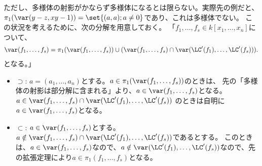 ただし、多様体の射影がかならず多様体になるとは限らない。実際先の例だと、
$\pi_1(\var(y-z,xy-1))= \set{(a,a); a\neq 0}$であり、これは多様体でない。
この状況を考えるために、次の分解を用意しておく。
「$f_1,\dots,f_s \in k[x_1,\dots,x_n]$について、
\begin{align}
  \var(f_1,\dots,f_s)
  =
  \pi_1(\var(f_1,\dots,f_s))
  \cup
  (\var(f_1,\dots,f_s) \cap \var(\LC'(f_1),\dots,\LC'(f_s))).
\end{align}
となる。」
\begin{myproof}
  \begin{itemize}
    \item $\supset$:
    $a=(a_1,\dots,a_n)$とする。$a\in \pi_1(\var(f_1,\dots,f_s))$のときは、
    先の「多様体の射影は部分解に含まれる」より、$a\in \var(f_1,\dots,f_s)$となる。
    $a\in \var(f_1,\dots,f_s)\cap \var(\LC'(f_1),\dots,\LC'(f_s))$
    のときは自明に$a\in \var(f_1,\dots,f_s)$となる。
    \item $\subset$:
    $a\in \var(f_1,\dots,f_s)$とする。
    $a\notin \var(f_1,\dots,f_s)\cap \var(\LC'(f_1),\dots,\LC'(f_s))$であるとする。
    このときは、$a\in \var(f_1,\dots,f_s)$なので、$a\notin \var(\LC'(f_1),\dots,\LC'(f_s))$なので、先の拡張定理により$a\in \pi_1(f_1,\dots,f_s)$となる。
  \end{itemize}
\end{myproof}

